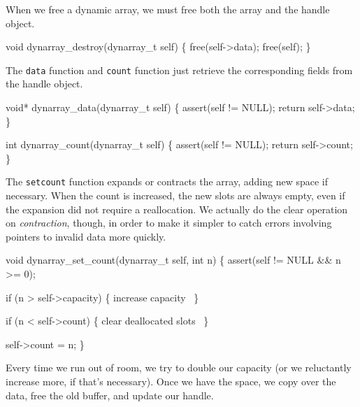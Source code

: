 When we free a dynamic array, we must free both the array and
the handle object.

\nwenddocs{}\plusendmoddef
void dynarray_destroy(dynarray_t self)
\{
    free(self->data);
    free(self);
\}

\nwendcode{}\nwdocspar

The {\tt{}data} function and {\tt{}count} function just retrieve the
corresponding fields from the handle object.

\nwenddocs{}\plusendmoddef
void* dynarray_data(dynarray_t self)
\{
    assert(self != NULL);
    return self->data;
\}

int dynarray_count(dynarray_t self)
\{
    assert(self != NULL);
    return self->count;
\}

\nwendcode{}\nwdocspar

The {\tt{}set{}count} function expands or contracts the array,
adding new space if necessary.  When the count is increased,
the new slots are always empty, even if the expansion did
not require a reallocation.  We actually do the clear
operation on \emph{contraction}, though, in order to make
it simpler to catch errors involving pointers to invalid data
more quickly.

\nwenddocs{}\plusendmoddef
void dynarray_set_count(dynarray_t self, int n)
\{
    assert(self != NULL && n >= 0);

    if (n > self->capacity) \{
        \LA{}increase capacity~{\nwtagstyle{}}\RA{}
    \}

    if (n < self->count) \{
        \LA{}clear deallocated slots~{\nwtagstyle{}}\RA{}
    \}

    self->count = n;
\}

\nwendcode{}\nwdocspar

Every time we run out of room, we try to double our capacity
(or we reluctantly increase more, if that's necessary).
Once we have the space, we copy over the data, free the old
buffer, and update our handle.


